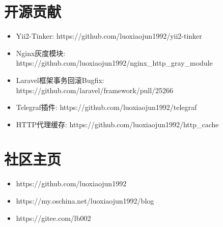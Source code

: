 \documentclass[a4paper,12pt]{article}
\begin{document}
\begin{CJK}{UTF8}{gbsn}
		\section{开源贡献}
		 	\begin{itemize}
				\item{Yii2-Tinker: https://github.com/luoxiaojun1992/yii2-tinker}
				\item{Nginx灰度模块: https://github.com/luoxiaojun1992/nginx\_http\_gray\_module}
				\item{Laravel框架事务回滚Bugfix: https://github.com/laravel/framework/pull/25266}
				\item{Telegraf插件: https://github.com/luoxiaojun1992/telegraf}
				\item{HTTP代理缓存: https://github.com/luoxiaojun1992/http\_cache}
			\end{itemize}
		
		\section{社区主页}
			\begin{itemize}
				\item{https://github.com/luoxiaojun1992}
				\item{https://my.oschina.net/luoxiaojun1992/blog}
				\item{https://gitee.com/lb002}
			\end{itemize}

	\end{CJK}
\end{document}
